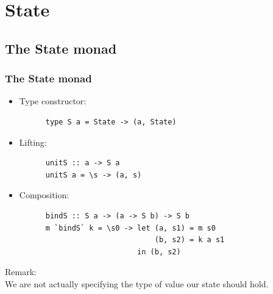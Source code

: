 \documentclass{beamer}
\begin{document}
\section{State}
\subsection{The State monad}
\begin{frame}[fragile]
  \frametitle{The State monad}
  \begin{itemize}
  \item<1-> Type constructor: \\
    \begin{lstlisting}
      type S a = State -> (a, State)
    \end{lstlisting}
  \item<1-> Lifting: 
    \begin{lstlisting}
      unitS :: a -> S a
      unitS a = \s -> (a, s)
    \end{lstlisting}
  \item<1-> Composition:
    \begin{lstlisting}
      bindS :: S a -> (a -> S b) -> S b
      m `bindS` k = \s0 -> let (a, s1) = m s0
                               (b, s2) = k a s1
                           in (b, s2)
    \end{lstlisting}
  \end{itemize}  

  Remark: \\
  We are not actually specifying the type of value our state should hold.
\end{frame}
\end{document}
